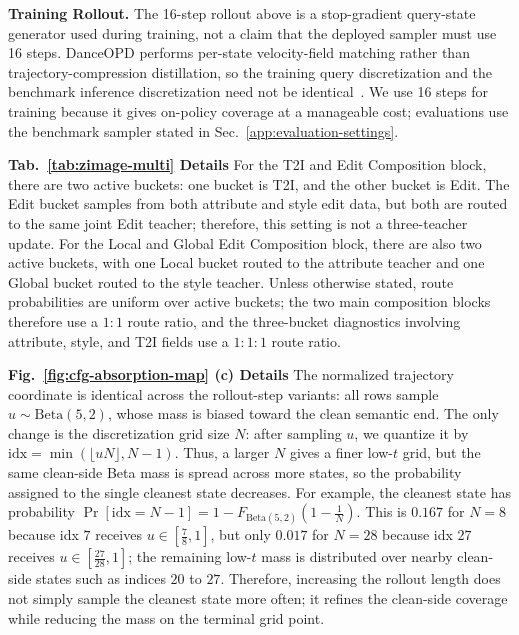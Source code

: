 \documentclass{llmxive}
\begin{document}
\noindent\textbf{Training Rollout.}
The 16-step rollout above is a stop-gradient query-state generator used during training, not a claim that the deployed sampler must use 16 steps. DanceOPD performs per-state velocity-field matching rather than trajectory-compression distillation, so the training query discretization and the benchmark inference discretization need not be identical~\cite{lu2022dpm,karras2022elucidating}. We use 16 steps for training because it gives on-policy coverage at a manageable cost; evaluations use the benchmark sampler stated in Sec.~\ref{app:evaluation-settings}.

\noindent\textbf{Tab.~\ref{tab:zimage-multi} Details}
For the T2I and Edit Composition block, there are two active buckets: one bucket is T2I, and the other bucket is Edit. The Edit bucket samples from both attribute and style edit data, but both are routed to the same joint Edit teacher; therefore, this setting is not a three-teacher update. For the Local and Global Edit Composition block, there are also two active buckets, with one Local bucket routed to the attribute teacher and one Global bucket routed to the style teacher. Unless otherwise stated, route probabilities are uniform over active buckets; the two main composition blocks therefore use a $1{:}1$ route ratio, and the three-bucket diagnostics involving attribute, style, and T2I fields use a $1{:}1{:}1$ route ratio.

\noindent\textbf{Fig.~\ref{fig:cfg-absorption-map} (c) Details}
The normalized trajectory coordinate is identical across the rollout-step variants: all rows sample $u\sim\mathrm{Beta}(5,2)$, whose mass is biased toward the clean semantic end. The only change is the discretization grid size $N$: after sampling $u$, we quantize it by $\mathrm{idx}=\min(\lfloor uN\rfloor,N-1)$. Thus, a larger $N$ gives a finer low-$t$ grid, but the same clean-side Beta mass is spread across more states, so the probability assigned to the single cleanest state decreases. For example, the cleanest state has probability $\Pr[\mathrm{idx}=N-1]=1-F_{\mathrm{Beta}(5,2)}(1-\frac{1}{N})$. This is $0.167$ for $N{=}8$ because idx $7$ receives $u\in[\frac{7}{8},1]$, but only $0.017$ for $N{=}28$ because idx $27$ receives $u\in[\frac{27}{28},1]$; the remaining low-$t$ mass is distributed over nearby clean-side states such as indices $20$ to $27$. Therefore, increasing the rollout length does not simply sample the cleanest state more often; it refines the clean-side coverage while reducing the mass on the terminal grid point.
\end{document}

